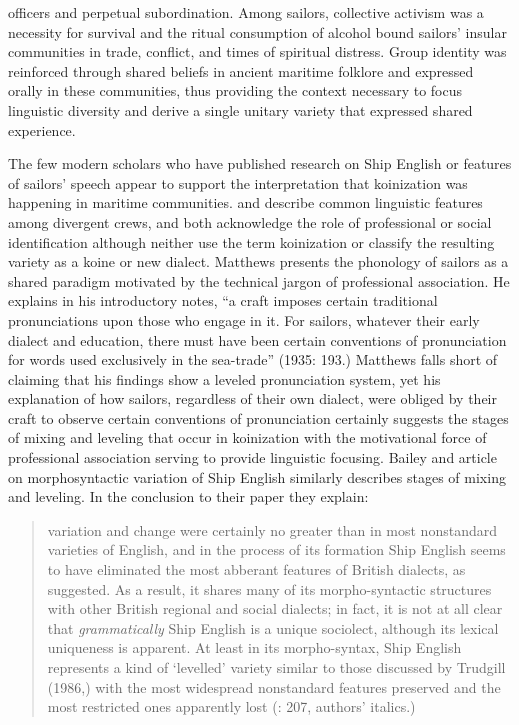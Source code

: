 officers and perpetual subordination. Among sailors, collective activism was a necessity for survival and the ritual consumption of alcohol bound sailors’ insular communities in trade, conflict, and times of spiritual distress. Group identity was reinforced through shared beliefs in ancient maritime folklore and expressed orally in these communities, thus providing the context necessary to focus linguistic diversity and derive a single unitary variety that expressed shared experience. 


The few modern scholars who have published research on Ship English or features of sailors’ speech appear to support the interpretation that koinization was happening in maritime communities. \citet{Matthews1935} and \citet{BaileyRoss1988} describe common linguistic features among divergent crews, and both acknowledge the role of professional or social identification although neither use the term koinization or classify the resulting variety as a koine or new dialect. Matthews presents the phonology of sailors as a shared paradigm motivated by the technical jargon of professional association. He explains in his introductory notes, “a craft imposes certain traditional pronunciations upon those who engage in it. For sailors, whatever their early dialect and education, there must have been certain conventions of pronunciation for words used exclusively in the sea-trade” (1935: 193.) Matthews falls short of claiming that his findings show a leveled pronunciation system, yet his explanation of how sailors, regardless of their own dialect, were obliged by their craft to observe certain conventions of pronunciation certainly suggests the stages of mixing and leveling that occur in koinization with the motivational force of professional association serving to provide linguistic focusing. Bailey and  article on morphosyntactic variation of Ship English similarly describes stages of mixing and leveling. In the conclusion to their paper they explain: 


\begin{quotation}
variation and change were certainly no greater than in most nonstandard varieties of English, and in the process of its formation Ship English seems to have eliminated the most abberant features of British dialects, as \citet{Hancock1976} suggested. As a result, it shares many of its morpho-syntactic structures with other British regional and social dialects; in fact, it is not at all clear that \textit{grammatically} Ship English is a unique sociolect, although its lexical uniqueness is apparent. At least in its morpho-syntax, Ship English represents a kind of ‘levelled’ variety similar to those discussed by Trudgill (1986,) with the most widespread nonstandard features preserved and the most restricted ones apparently lost (\citealt{BaileyRoss1988}: 207, authors’ italics.) \end{quotation}

